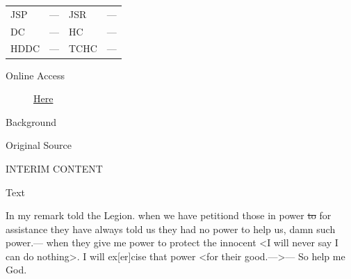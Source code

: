 					\begin{tabular}{p{0.5in}p{1in}p{0.5in}p{1in}}
					JSP	 	& ---		& JSR 		& --- \\
					DC	 	& ---		& HC 		& --- \\
					HDDC 	& ---		& TCHC 		& --- \\
					\end{tabular}
				
				\begin{description}
					\item[Online Access] \href{https://www.josephsmithpapers.org/paper-summary/discourse-6-may-1843-as-reported-by-willard-richards/1}{Here}
				\end{description}
				
				\begin{description}
					\item[Background]
				\end{description}
				
				
				\begin{description}
					\item[Original Source]
				\end{description}
				
					INTERIM CONTENT
				
				
				\begin{description}
					\item[Text]
				\end{description}
				
					In my remark told the Legion. when we have petitiond those in power \sout{to} for assistance they have always told us they had no power to help us, damn such power.--- when they give me power to protect the innocent <I will never say I can do nothing>. I will ex[er]cise that power <for their good.--->--- So help me God.
					
